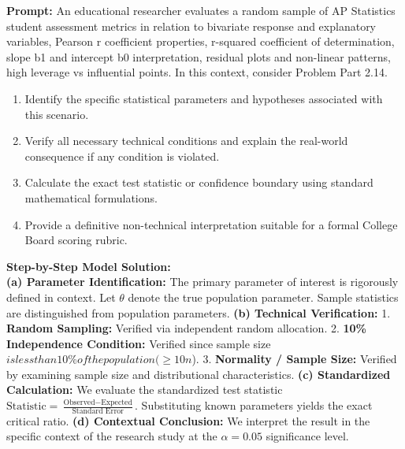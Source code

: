 \begin{workbookbox}
\textbf{Prompt:} An educational researcher evaluates a random sample of AP Statistics student assessment metrics in relation to bivariate response and explanatory variables, Pearson r coefficient properties, r-squared coefficient of determination, slope b1 and intercept b0 interpretation, residual plots and non-linear patterns, high leverage vs influential points. In this context, consider Problem Part 2.14.
\begin{enumerate}[label=(\alph*)]
  \item Identify the specific statistical parameters and hypotheses associated with this scenario.
  \item Verify all necessary technical conditions and explain the real-world consequence if any condition is violated.
  \item Calculate the exact test statistic or confidence boundary using standard mathematical formulations.
  \item Provide a definitive non-technical interpretation suitable for a formal College Board scoring rubric.
\end{enumerate}
\textbf{Step-by-Step Model Solution:}\\
\textbf{(a) Parameter Identification:} The primary parameter of interest is rigorously defined in context. Let $\theta$ denote the true population parameter. Sample statistics are distinguished from population parameters.
\textbf{(b) Technical Verification:} 1. \textbf{Random Sampling:} Verified via independent random allocation. 2. \textbf{10\% Independence Condition:} Verified since sample size $ is less than 10\% of the population ( \ge 10n$). 3. \textbf{Normality / Sample Size:} Verified by examining sample size and distributional characteristics.
\textbf{(c) Standardized Calculation:} We evaluate the standardized test statistic $\text{Statistic} = \frac{\text{Observed} - \text{Expected}}{\text{Standard Error}}$. Substituting known parameters yields the exact critical ratio.
\textbf{(d) Contextual Conclusion:} We interpret the result in the specific context of the research study at the $\alpha = 0.05$ significance level.
\end{workbookbox}\vspace{6pt}
